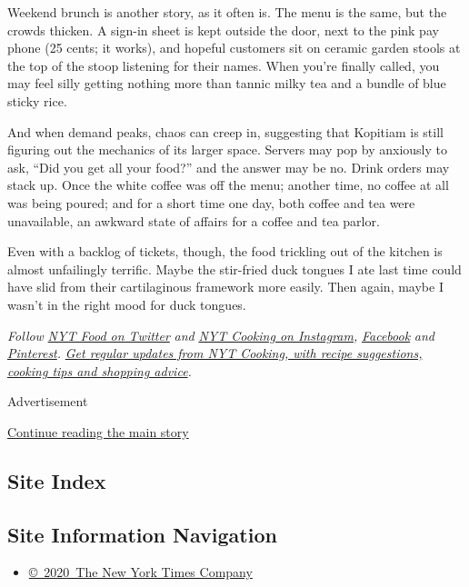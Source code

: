 Weekend brunch is another story, as it often is. The menu is the same,
but the crowds thicken. A sign-in sheet is kept outside the door, next
to the pink pay phone (25 cents; it works), and hopeful customers sit on
ceramic garden stools at the top of the stoop listening for their names.
When you're finally called, you may feel silly getting nothing more than
tannic milky tea and a bundle of blue sticky rice.

And when demand peaks, chaos can creep in, suggesting that Kopitiam is
still figuring out the mechanics of its larger space. Servers may pop by
anxiously to ask, ``Did you get all your food?'' and the answer may be
no. Drink orders may stack up. Once the white coffee was off the menu;
another time, no coffee at all was being poured; and for a short time
one day, both coffee and tea were unavailable, an awkward state of
affairs for a coffee and tea parlor.

Even with a backlog of tickets, though, the food trickling out of the
kitchen is almost unfailingly terrific. Maybe the stir-fried duck
tongues I ate last time could have slid from their cartilaginous
framework more easily. Then again, maybe I wasn't in the right mood for
duck tongues.

\emph{Follow} \emph{\href{https://twitter.com/nytfood}{NYT Food on
Twitter}} \emph{and}
\emph{\href{https://www.instagram.com/nytcooking/}{NYT Cooking on
Instagram},}
\emph{\href{https://www.facebookcorewwwi.onion/nytcooking/}{Facebook}}
\emph{and}
\emph{\href{https://www.pinterest.com/nytcooking/}{Pinterest}.}
\emph{\href{https://www.nytimes3xbfgragh.onion/newsletters/cooking}{Get
regular updates from NYT Cooking, with recipe suggestions, cooking tips
and shopping advice}.}

Advertisement

\protect\hyperlink{after-bottom}{Continue reading the main story}

\hypertarget{site-index}{%
\subsection{Site Index}\label{site-index}}

\hypertarget{site-information-navigation}{%
\subsection{Site Information
Navigation}\label{site-information-navigation}}

\begin{itemize}
\tightlist
\item
  \href{https://help.nytimes3xbfgragh.onion/hc/en-us/articles/115014792127-Copyright-notice}{©~2020~The
  New York Times Company}
\end{itemize}

